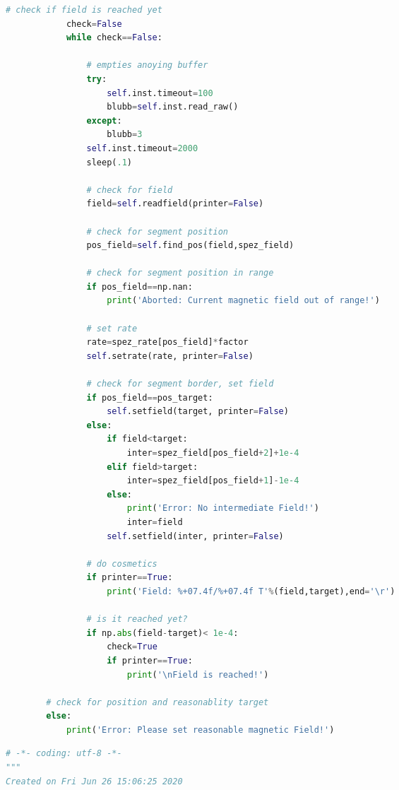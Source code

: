 \begin{landscape}
\begin{multicols}{2}
\begin{lstlisting}[language=Python]
            # check if field is reached yet
            check=False
            while check==False:
                
                # empties anoying buffer
                try:
                    self.inst.timeout=100
                    blubb=self.inst.read_raw()
                except:
                    blubb=3
                self.inst.timeout=2000
                sleep(.1)
                
                # check for field
                field=self.readfield(printer=False)
                    
                # check for segment position
                pos_field=self.find_pos(field,spez_field)
                
                # check for segment position in range
                if pos_field==np.nan:
                    print('Aborted: Current magnetic field out of range!')
                    
                # set rate
                rate=spez_rate[pos_field]*factor
                self.setrate(rate, printer=False)

                # check for segment border, set field
                if pos_field==pos_target:
                    self.setfield(target, printer=False)
                else:
                    if field<target:
                        inter=spez_field[pos_field+2]+1e-4
                    elif field>target:
                        inter=spez_field[pos_field+1]-1e-4
                    else:
                        print('Error: No intermediate Field!')
                        inter=field
                    self.setfield(inter, printer=False)
                
                # do cosmetics
                if printer==True:
                    print('Field: %+07.4f/%+07.4f T'%(field,target),end='\r')
                        
                # is it reached yet?
                if np.abs(field-target)< 1e-4:
                    check=True
                    if printer==True:
                        print('\nField is reached!')       
                        
        # check for position and reasonablity target 
        else:
            print('Error: Please set reasonable magnetic Field!')
\end{lstlisting} %

\begin{lstlisting}[language=Python]
# -*- coding: utf-8 -*-
"""
Created on Fri Jun 26 15:06:25 2020


\end{lstlisting}
\end{multicols}
\end{landscape}
